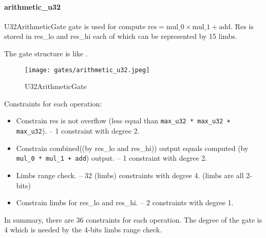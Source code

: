 \paragraph{arithmetic\_u32}

U32ArithmeticGate gate is used for compute $\text{res} = \text{mul\_0} \times \text{mul\_1} + \text{add}$. Res is stored in res\_lo and res\_hi each of which can be represented by 15 limbs.

The gate structure is like .

\begin{figure}[!ht]
    \centering
    \texttt{[image: gates/arithmetic\_u32.jpeg]}
    \caption{U32ArithmeticGate}
    \label{fig:arithmetic-u32}
\end{figure}

Constraints for each operation:
\begin{itemize}
    \item Constrain res is not overflow (less equal than \verb|max_u32 * max_u32 + max_u32|). -- 1 constraint with degree 2.
    \item Constrain combined((by res\_lo and res\_hi)) output equals computed (by \verb|mul_0 * mul_1 + add|) output. -- 1 constraint with degree 2.
    \item Limbs range check. -- 32 (limbs) constraints with degree 4. (limbs are all 2-bits)
    \item Constrain limbs for res\_lo and res\_hi. -- 2 constraints with degree 1.
\end{itemize}

In summary, there are 36 constraints for each operation. The degree of the gate is 4 which is needed by the 4-bits limbs range check.
